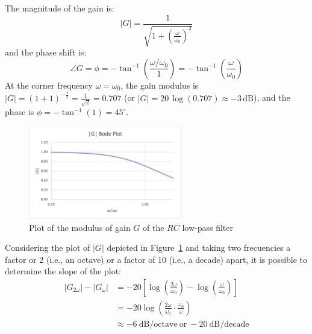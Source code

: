 The magnitude of the gain is:
\begin{equation}
|G| = \frac{1}{\sqrt{1 + \left(\frac{\omega}{\omega_0}\right)^2}}
\end{equation}
and the phase shift is:
\begin{equation}
\angle G = \phi =  -\tan^{-1}\left(\frac{\omega/\omega_0}{1}\right) = 
-\tan^{-1}\left(\frac{\omega}{\omega_0}\right)
\end{equation}
At the corner frequency $\omega = \omega_0$, the gain modulus is $|G| = (1 + 1)^{-\frac{1}{2}} = \frac{1}{\sqrt{2}} = 0.707$ (or $|G| = 20\,\log(0.707)\approx -3\,\textrm{dB}$), and the phase is $\phi = -\tan^{-1}(1) = 45^{\circ}$.
\begin{figure}[h!]
  \centering
  \includegraphics[width=0.6\textwidth]{"images/bode"}
  \caption{Plot of the modulus of gain $G$ of the $RC$ low-pass filter} 
  \label{Fig:Bode}
\end{figure}
Considering the plot of $|G|$ depicted in Figure~\ref{Fig:Bode} and taking two frecuencies a factor or 2 (i.e., an octave) or a factor of 10 (i.e., a decade) apart, it is possible to determine the slope of the plot:
\begin{equation}
\begin{split}
|G_{2\omega}|-|G_{\omega}| &= -20\left[\log\left(\frac{2\omega}{\omega_0}\right)-\log\left(\frac{\omega}{\omega_0}\right)\right]\\
                           &= -20\log\left(\frac{2\omega}{\omega_0}\cdot\frac{\omega_0}{\omega}\right)\\
                           &\approx -6~\textrm{dB/octave}~\textrm{or}~-20~\textrm{dB/decade}
\end{split}
\end{equation}

 
